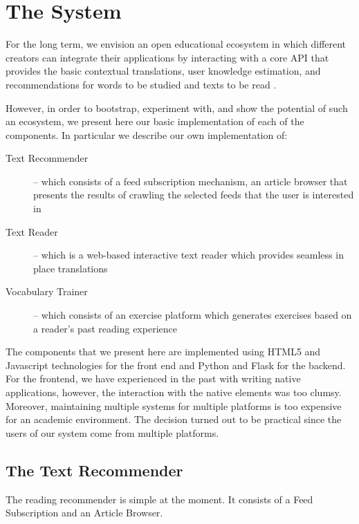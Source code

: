 
\newpage
\section{The System}

For the long term, we envision an open educational ecosystem in which different creators can integrate their applications by interacting with a core API that provides the basic contextual translations, user knowledge estimation, and recommendations for words to be studied and texts to be read \cite{Lungu16}. 

However, in order to bootstrap, experiment with, and show the potential of such an ecosystem, we present here our basic implementation of each of the components. In particular we describe our own implementation of: 

\begin{description}

  \item [Text Recommender] -- which consists of a feed subscription mechanism, an article browser that presents the results of crawling the selected feeds that the user is interested in

  \item [Text Reader] -- which is a web-based interactive text reader which provides seamless in place translations
  
  \item [Vocabulary Trainer] -- which consists of an exercise platform which generates exercises based on a reader's past reading experience

\end{description}

The components that we present here are implemented using HTML5 and Javascript technologies for the front end and Python and Flask for the backend. For the frontend, we have experienced in the past with writing native applications, however, the interaction with the native elements was too clumsy. Moreover, maintaining multiple systems for multiple platforms is too expensive for an academic environment. The decision turned out to be practical since the users of our system come from multiple platforms.


\subsection{The Text Recommender}
The reading recommender is simple at the moment. It consists of a Feed Subscription and an Article Browser.

